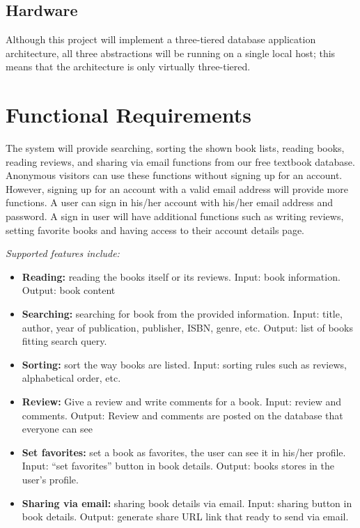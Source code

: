 \documentclass[titlepage]{article}
\begin{document}
	\subsection{Hardware}
		Although this project will implement a three-tiered database application architecture, all three abstractions will be running on a single local host; this means that the architecture is only virtually three-tiered. 
	
	\section{Functional Requirements}
	The system will provide searching, sorting the shown book lists, reading books, reading reviews, and sharing via email functions from our free textbook database. 
	Anonymous visitors can use these functions without signing up for an account. However, signing up for an account with a valid email address will provide more functions. 
	A user can sign in his/her account with his/her email address and password. A sign in user will have additional functions such as writing reviews, setting favorite books and having access to their account details page. 
	

\textit{Supported features include:}
	\begin{itemize}
\item	\textbf{Reading:} reading the books itself or its reviews. Input: book information. Output: book content


\item	\textbf{Searching:} searching for book from the provided information. Input: title, author, year of publication, publisher, ISBN, genre, etc. Output: list of books fitting search query.
	
	
\item	\textbf{Sorting:} sort the way books are listed. Input: sorting rules such as reviews, alphabetical order, etc.
	
	
\item	\textbf{Review:} Give a review and write comments for a book. Input: review and comments. Output: Review and comments are posted on the database that everyone can see
	
	
\item	\textbf{Set favorites:} set a book as favorites, the user can see it in his/her profile. Input: “set favorites” button in book details. Output: books stores in the user’s profile.
	
	
\item	\textbf{Sharing via email:} sharing book details via email. Input: sharing button in book details. Output: generate share URL link that ready to send via email. 

	\end{itemize}
\end{document}
